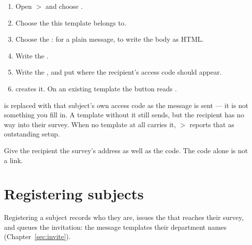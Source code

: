 \documentclass[11pt, a4paper]{article}
\begin{document}
\begin{enumerate}
  \item Open  $>$  and choose .
  \item Choose the  this template belongs to.
  \item Choose the :  for a plain message,
         to write the body as HTML.
  \item Write the .
  \item Write the , and put  where the recipient's access code
        should appear.
  \item {} creates it. On an existing template the button reads .
\end{enumerate}


\begin{elicitnote}
 is replaced with that subject's own access code as the message is sent —
it is not something you fill in. A template without it still sends, but the recipient has no way
into their survey. When no template at all carries it,  $>$  reports
that as outstanding setup.
\end{elicitnote}

Give the recipient the survey's address as well as the code. The code alone is not a link.


\section{Registering subjects}
\label{sec:register}

Registering a subject records who they are, issues the  that reaches their
survey, and queues the invitation: the message templates their department names
(Chapter~\ref{sec:invite}).
\end{document}
